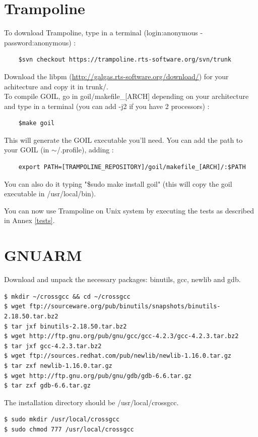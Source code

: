 \section{Trampoline}
To download Trampoline, type in a terminal (login:anonymous - password:anonymous) :
	\begin{verbatim}
	$svn checkout https://trampoline.rts-software.org/svn/trunk
	\end{verbatim}
Download the libpm (\href{http://galgas.rts-software.org/download/}{http://galgas.rts-software.org/download/}) for your achitecture and copy it in trunk/.\\
To compile GOIL, go in goil/makefile\_[ARCH] depending on your architecture and type in a terminal (you can add -j2 if you have 2 processors) :
	\begin{verbatim}
	$make goil
	\end{verbatim}
This will generate the GOIL executable you'll need. You can add the path to your GOIL (in $\sim$/.profile), adding :
	\begin{verbatim}
	export PATH=[TRAMPOLINE_REPOSITORY]/goil/makefile_[ARCH]/:$PATH
	\end{verbatim}

You can also do it typing "\$sudo make install goil" (this will copy the goil executable in /usr/local/bin).

You can now use Trampoline on Unix system by executing the tests as described in Annex \ref{tests}.

\section{GNUARM}
Download and unpack the necessary packages: binutils, gcc, newlib and gdb.
\begin{verbatim}
$ mkdir ~/crossgcc && cd ~/crossgcc
$ wget ftp://sourceware.org/pub/binutils/snapshots/binutils-2.18.50.tar.bz2
$ tar jxf binutils-2.18.50.tar.bz2
$ wget http://ftp.gnu.org/pub/gnu/gcc/gcc-4.2.3/gcc-4.2.3.tar.bz2
$ tar jxf gcc-4.2.3.tar.bz2
$ wget ftp://sources.redhat.com/pub/newlib/newlib-1.16.0.tar.gz
$ tar zxf newlib-1.16.0.tar.gz
$ wget http://ftp.gnu.org/pub/gnu/gdb/gdb-6.6.tar.gz
$ tar zxf gdb-6.6.tar.gz
\end{verbatim}

The installation directory should be /usr/local/crossgcc.

\begin{verbatim}
$ sudo mkdir /usr/local/crossgcc
$ sudo chmod 777 /usr/local/crossgcc
\end{verbatim}

